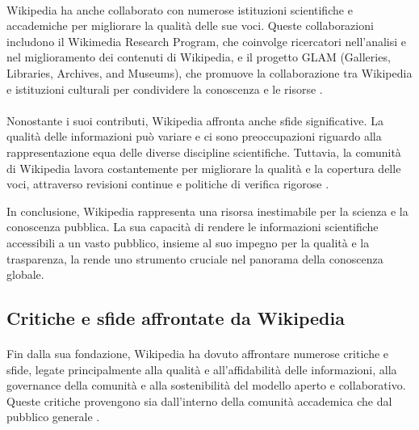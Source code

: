 \documentclass[12pt,a4paper]{report}
\begin{document}
\paragraph*{}
Wikipedia ha anche collaborato con numerose istituzioni scientifiche e accademiche per migliorare la qualità delle sue voci. Queste collaborazioni includono il Wikimedia Research Program, che coinvolge ricercatori nell'analisi e nel miglioramento dei contenuti di Wikipedia, e il progetto GLAM (Galleries, Libraries, Archives, and Museums), che promuove la collaborazione tra Wikipedia e istituzioni culturali per condividere la conoscenza e le risorse \cite{jemielniak2014wikipedia}.

\paragraph*{}
Nonostante i suoi contributi, Wikipedia affronta anche sfide significative. La qualità delle informazioni può variare e ci sono preoccupazioni riguardo alla rappresentazione equa delle diverse discipline scientifiche. Tuttavia, la comunità di Wikipedia lavora costantemente per migliorare la qualità e la copertura delle voci, attraverso revisioni continue e politiche di verifica rigorose \cite{denning2005wikipedia}.

In conclusione, Wikipedia rappresenta una risorsa inestimabile per la scienza e la conoscenza pubblica. La sua capacità di rendere le informazioni scientifiche accessibili a un vasto pubblico, insieme al suo impegno per la qualità e la trasparenza, la rende uno strumento cruciale nel panorama della conoscenza globale.

\subsection{Critiche e sfide affrontate da Wikipedia}

\paragraph*{}
Fin dalla sua fondazione, Wikipedia ha dovuto affrontare numerose critiche e sfide, legate principalmente alla qualità e all'affidabilità delle informazioni, alla governance della comunità e alla sostenibilità del modello aperto e collaborativo. Queste critiche provengono sia dall'interno della comunità accademica che dal pubblico generale \cite{reagle2010good}.
\end{document}
